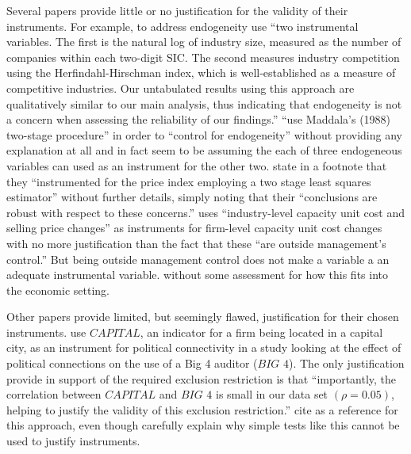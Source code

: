 \documentclass[11pt]{amsart}
\begin{document}
Several papers provide little or no justification for the validity of their instruments. For example, to address endogeneity \citet{Cohen:2014jl} use ``two instrumental variables. The first is the natural log of industry size, measured as the number of companies within each two-digit SIC. The second measures industry competition using the Herfindahl-Hirschman index, which is well-established as a measure of competitive industries. Our untabulated results using this approach are qualitatively similar to our main analysis, thus indicating that endogeneity is not a concern when assessing the reliability of our findings.''
\citet{Vermeer:2014bs} ``use Maddala's (1988) two-stage procedure'' in order to ``control for endogeneity'' without providing any explanation at all and in fact seem to be assuming the each of three endogeneous variables can used as an instrument for the other two.
\citet[p.48]{Fox:2014io} state in a footnote that they ``instrumented for the price index employing a two stage least squares estimator'' without further details, simply noting that their ``conclusions are robust with respect to these concerns.''
\citet{Cannon:2014im} uses ``industry-level capacity unit cost and selling price changes'' as instruments for firm-level capacity unit cost changes with no more justification than the fact that these ``are outside management's control.'' But being outside management control does not make a variable a an adequate instrumental variable. without some assessment for how this fits into the economic setting. %


Other papers provide limited, but seemingly flawed, justification for their chosen instruments. 
 \citet{Guedhami:2013cj} use $\textit{CAPITAL}$, an indicator for a firm being located in a capital city, as an instrument for political connectivity in a study looking at the effect of political connections on the use of a Big 4 auditor ($\textit{BIG 4}$).
 The only justification \citet{Guedhami:2013cj} provide in support of the required exclusion restriction  is that ``importantly, the correlation between $\textit{CAPITAL}$ and $\textit{BIG 4}$ is small in our data set $(\rho = 0.05)$, helping to justify the validity of this exclusion restriction.''
 \citet{Guedhami:2013cj} cite \citet{Larcker:2010fq} as a reference for this approach, even though \citet{Larcker:2010fq} carefully explain why simple tests like this cannot be used to justify instruments.
 
\end{document}
